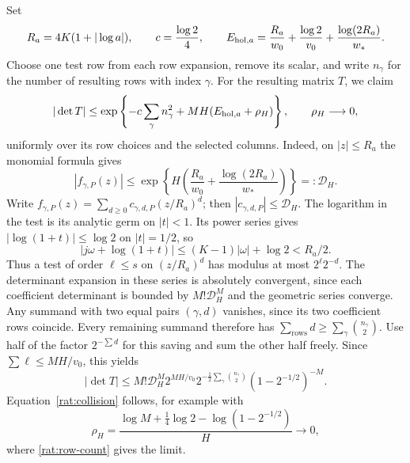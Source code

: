 \documentclass[11pt]{article}
\theoremstyle{definition}
\theoremstyle{remark}
\numberwithin{equation}{section}
\begin{document}
Set
\begin{equation}
 R_a=4K(1+|\log a|),\qquad c=\frac{\log2}{4},\qquad
 E_{{\rm hol},a}=\frac{R_a}{w_0}+\frac{\log2}{v_0}
                   +\frac{\log(2R_a)}{w_*}.
 \label{rat:hol-error}
\end{equation}
Choose one test row from each row expansion, remove its scalar, and
write $n_\gamma$ for the number of resulting rows with index $\gamma$.
For the resulting matrix $T$, we claim
\begin{equation}
 |\det T|\le
 \exp\left\{-c\sum_\gamma n_\gamma^2
                 +MH(E_{{\rm hol},a}+\rho_H)\right\},
 \qquad\rho_H\longrightarrow0,
 \label{rat:collision}
\end{equation}
uniformly over its row choices and the selected columns.
Indeed, on $|z|\le R_a$ the monomial formula gives
\[
 |f_{\gamma,P}(z)|\le
 \exp\left\{H\left(\frac{R_a}{w_0}
                       +\frac{\log(2R_a)}{w_*}\right)\right\}
 =:\mathcal D_H.
\]
Write $f_{\gamma,P}(z)=\sum_{d\ge0}c_{\gamma,d,P}(z/R_a)^d$;
then $|c_{\gamma,d,P}|\le\mathcal D_H$.
The logarithm in the test is its analytic germ on $|t|<1$.
Its power series gives $|\log(1+t)|\le\log2$ on $|t|=1/2$, so
\[
 |j\omega+\log(1+t)|
 \le(K-1)|\omega|+\log2<R_a/2.
\]
Thus a test of order $\ell\le s$ on $(z/R_a)^d$ has modulus at most
$2^\ell2^{-d}$.  The determinant expansion in these series is absolutely
convergent, since each coefficient determinant is bounded by
$M!\mathcal D_H^M$ and the geometric series converge.
Any summand with two equal pairs $(\gamma,d)$ vanishes, since its two
coefficient rows coincide.  Every remaining summand therefore has
$\sum_{\text{rows}}d\ge\sum_\gamma\binom{n_\gamma}{2}$.
Use half of the factor $2^{-\sum d}$ for this saving and sum the other
half freely.  Since $\sum\ell\le MH/v_0$, this yields
\[
 |\det T|\le M!\mathcal D_H^M2^{MH/v_0}
  2^{-\frac12\sum_\gamma\binom{n_\gamma}{2}}
  (1-2^{-1/2})^{-M}.
\]
Equation~\eqref{rat:collision} follows, for example with
\[
 \rho_H=\frac{\log M+\frac14\log2
                       -\log(1-2^{-1/2})}{H}\longrightarrow0,
\]
where \eqref{rat:row-count} gives the limit.
\end{document}
